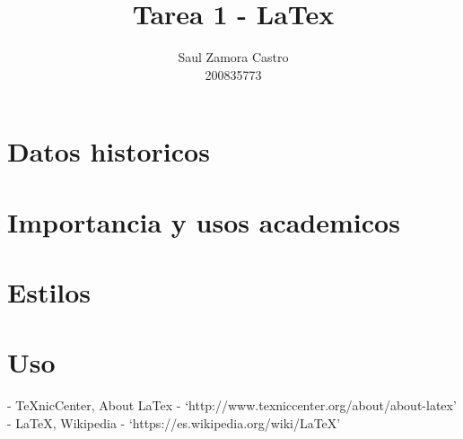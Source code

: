 \documentclass[11pt]{article}
\title{\textbf{Tarea 1 - LaTex}}
\author{Saul Zamora Castro\\200835773\\}
\date{}
\begin{document}
\maketitle

\section{Datos historicos}
\section{Importancia y usos academicos}
\section{Estilos}
\section{Uso}

\begin{thebibliography}{99}
- TeXnicCenter, About LaTex - `http://www.texniccenter.org/about/about-latex'
\\- LaTeX, Wikipedia - `https://es.wikipedia.org/wiki/LaTeX'
\end{thebibliography}
\end{document}

